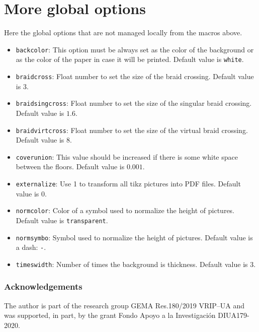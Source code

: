 \documentclass[reqno]{../../../Projects/LaTeX/gtpart}
\numberwithin{equation}{section}
\begin{document}
\section{More global options}

Here the global options that are not managed locally from the macros above. 
\begin{itemize}
\item {\tt backcolor}: This option must be always set as the color of the background or as the color of the paper in case it will be printed. Default value is {\tt white}.
\item {\tt braidcross}: Float number to set the size of the braid crossing. Default value is $3$.
\item {\tt braidsingcross}: Float number to set the size of the singular braid crossing. Default value is $1.6$.
\item {\tt braidvirtcross}: Float number to set the size of the virtual braid crossing. Default value is $8$.
\item {\tt coverunion}: This value should be increased if there is some white space between the floors. Default value is $0.001$.
\item {\tt externalize}: Use 1 to transform all tikz pictures into PDF files. Default value is $0$.
\item {\tt normcolor}: Color of a symbol used to normalize the height of pictures. Default value is {\tt transparent}.
\item {\tt normsymbo}: Symbol used to normalize the height of pictures. Default value is a dash: {\tt -}.
\item {\tt timeswidth}: Number of times the background is thickness. Default value is $3$.
\end{itemize}

\subsubsection*{Acknowledgements}
The author is part of the research group GEMA Res.180/2019 VRIP--UA and was supported, in part, by the grant Fondo Apoyo a la Investigaci\'on DIUA179-2020.



\end{document}
